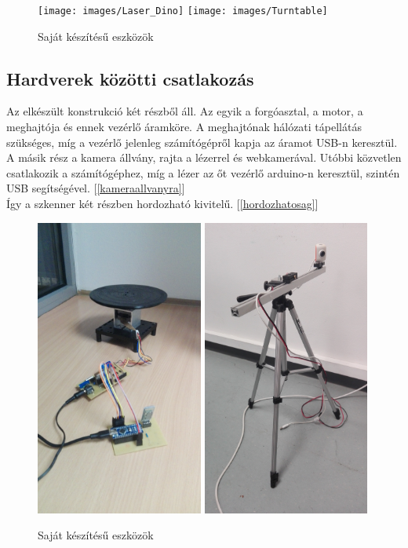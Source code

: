 \documentclass[12pt,a4paper]{article}
\begin{document}
 \begin{figure}[h!]
	\centering
	\texttt{[image: images/Laser\_Dino]}
	\texttt{[image: images/Turntable]}
	\caption{Saját készítésű eszközök}
\end{figure}

\subsection{Hardverek közötti csatlakozás}

Az elkészült konstrukció két részből áll. Az egyik a forgóasztal, a motor, a meghajtója és ennek vezérlő áramköre. A meghajtónak hálózati tápellátás szükséges, míg a vezérlő jelenleg számítógépről kapja az áramot USB-n keresztül.
\\[10pt]
A másik rész a kamera állvány, rajta a lézerrel és webkamerával. Utóbbi közvetlen csatlakozik a számítógéphez, míg a lézer az őt vezérlő arduino-n keresztül, szintén USB segítségével. [\ref{kameraallvanyra}]
\\[10pt]
Így a szkenner két részben hordozható kivitelű. [\ref{hordozhatosag}]
 \begin{figure}[h!]
	\centering
	\includegraphics[width=5.5cm]{images/forgoasztal}
	\includegraphics[width=5.5cm]{images/allvany}
	\caption{Saját készítésű eszközök}
\end{figure}
\end{document}
